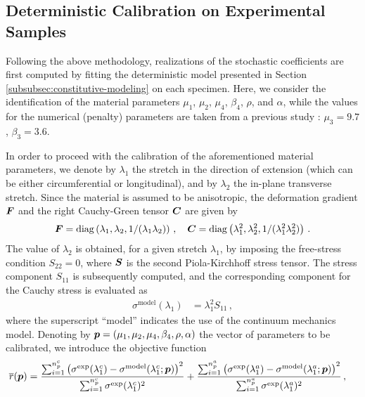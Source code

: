 \subsection{Deterministic Calibration on Experimental Samples}\label{subsec:det-calibration}

Following the above methodology, realizations of the stochastic coefficients are first computed by fitting the deterministic model presented in Section \ref{subsubsec:constitutive-modeling} on each specimen. Here, we consider the identification of the material parameters $\mu_1$, $\mu_2$, $\mu_4$, $\beta_4$, $\rho$, and $\alpha$, while the values for the numerical (penalty) parameters are taken from a previous study \cite{STABER201894}: $\mu_3 = 9.7$, $\beta_3 = 3.6$.

In order to proceed with the calibration of the aforementioned material parameters, we denote by $\lambda_1$ the stretch in the direction of extension (which can be either circumferential or longitudinal), and by $\lambda_2$ the in-plane transverse stretch. Since the material is assumed to be anisotropic, the deformation gradient $\boldsymbol{F}$ and the right Cauchy-Green tensor $\boldsymbol{C}$ are given by
\begin{equation}
    \boldsymbol{F} = \mathrm{diag}\left(\lambda_1, \lambda_2, 1/(\lambda_1 \lambda_2)\right)\,, \quad \boldsymbol{C} = \mathrm{diag}\left(\lambda_1^2, \lambda_2^2, 1/(\lambda_1^2 \lambda_2^2)\right)\,.
\end{equation}
The value of $\lambda_2$ is obtained, for a given stretch $\lambda_1$, by imposing the free-stress condition $S_{22} = 0$, where $\boldsymbol{S}$ is the second Piola-Kirchhoff stress tensor. The stress component $S_{11}$ is subsequently computed, and the corresponding component for the Cauchy stress is evaluated as
\begin{align}
    \sigma^{\text{model}}(\lambda_{1}) &= \lambda_{1}^2 S_{11}\,,
\end{align}
where the superscript ``model'' indicates the use of the continuum mechanics model. Denoting by $\boldsymbol{p}=(\mu_1,\mu_2,\mu_4,\beta_4,\rho,\alpha)$ the vector of parameters to be calibrated, we introduce the objective function
\begin{align}
    \overline{r}(\boldsymbol{p}) &= \frac{\sum_{i=1}^{n_p^c} \left( \sigma^{\text{exp}}(\lambda_{1}^c) - \sigma^{\text{model}}(\lambda_{1}^c; \boldsymbol{p}) \right)^2}{\sum_{i=1}^{n_p^c} \sigma^{\text{exp}}(\lambda_{1}^c)^2} + \frac{\sum_{i=1}^{n_p^a} \left( \sigma^{\text{exp}}(\lambda_{1}^a) - \sigma^{\text{model}}(\lambda_{1}^a; \boldsymbol{p}) \right)^2}{\sum_{i=1}^{n_p^a} \sigma^{\text{exp}}(\lambda_{1}^a)^2}\,,
\end{align}

